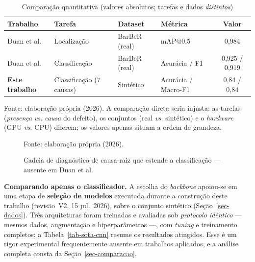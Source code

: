 \documentclass[
	article,			%
	11pt,				%
	oneside,			%
	a4paper,			%
	english,			%
	brazilian,			%
	sumario=tradicional
	]{abntex2}
\begin{document}
\begin{table}[htb]
\centering
\caption{Comparação quantitativa (valores absolutos; tarefas e dados \emph{distintos})}
\label{tab-sota-quant}
\footnotesize
\begin{tabular}{@{}p{3.0cm}p{3.6cm}p{2.4cm}p{2.3cm}c@{}}
\toprule
\textbf{Trabalho} & \textbf{Tarefa} & \textbf{Dataset} & \textbf{Métrica} & \textbf{Valor}\\
\midrule
Duan et al. \cite{duan2025barcode} & Localização & BarBeR (real) & mAP@0,5 & 0,984\\
Duan et al. \cite{duan2025barcode} & Classificação & BarBeR (real) & Acurácia / F1 & 0,925 / 0,919\\
\textbf{Este trabalho} & Classificação (7 causas) & Sintético & Acurácia / Macro-F1 & 0,84 / 0,84\\
\bottomrule
\end{tabular}

\vspace{2pt}
{\footnotesize Fonte: elaboração própria (2026). A comparação direta seria
injusta: as tarefas (\emph{presença} \textit{vs.} \emph{causa} do defeito), os
conjuntos (real \textit{vs.} sintético) e o \textit{hardware} (GPU \textit{vs.}
CPU) diferem; os valores apenas situam a ordem de grandeza.}
\end{table}

\begin{figure}[htb]
\centering
\caption{Cadeia de diagnóstico de causa-raiz que estende a classificação --- ausente em Duan et al.}
\label{fig-causaraiz}

\vspace{2pt}
{\footnotesize Fonte: elaboração própria (2026).}
\end{figure}

\noindent\textbf{Comparando apenas o classificador.} A escolha do \textit{backbone}
apoiou-se em uma etapa de \textbf{seleção de modelos} executada durante a
construção deste trabalho (revisão~V2, 15 jul.\ 2026), sobre o conjunto sintético
(Seção~\ref{sec-dados}). Três arquiteturas foram treinadas e avaliadas sob
\emph{protocolo idêntico} --- mesmos dados, augmentação e hiperparâmetros ---, com
\textit{tuning} e treinamento completos; a Tabela~\ref{tab-sota-cnn} resume os
resultados atingidos. Esse é um rigor experimental frequentemente ausente em
trabalhos aplicados, e a análise completa consta da Seção~\ref{sec-comparacao}.
\end{document}
